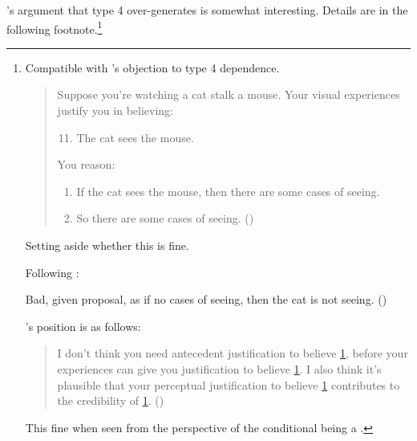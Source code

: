 \begin{note}
  \citeauthor{Pryor:2004ws}'s argument that type 4 over-generates is somewhat interesting.
  Details are in the following footnote.\footnote{
  Compatible with \citeauthor{Pryor:2004ws}'s objection to type 4 dependence.

    \begin{quote}
      Suppose you're watching a cat stalk a mouse. Your visual experiences justify you in believing:

      \begin{enumerate}[label=(\arabic*), ref=(\arabic*)]
        \setcounter{enumi}{10}
      \item
        \label{illu:Pryor:cat:1}
        The cat sees the mouse.
      \end{enumerate}

      You reason:

      \begin{enumerate}[label=(\arabic*), ref=(\arabic*), resume]
      \item
        \label{illu:Pryor:cat:2}
        If the cat sees the mouse, then there are some cases of seeing.
      \item
        \label{illu:Pryor:cat:3}
        So there are some cases of seeing.\nolinebreak
        \mbox{}\hfill\mbox{(\citeyear[361]{Pryor:2004ws})}
      \end{enumerate}
    \end{quote}

  Setting aside whether this is fine.

  Following \citeauthor{Pryor:2004ws}:

  Bad, given proposal, as if no cases of seeing, then the cat is not seeing. (\citeyear[361]{Pryor:2004ws})

  \citeauthor{Pryor:2004ws}'s position is as follows:

  \begin{quote}
    I don't think you need antecedent justification to believe \ref{illu:Pryor:cat:3}, before your experiences can give you justification to believe \ref{illu:Pryor:cat:1}.
    I also think it's plausible that your perceptual justification to believe \ref{illu:Pryor:cat:1} contributes to the credibility of \ref{illu:Pryor:cat:3}.\nolinebreak
    \mbox{}\hfill\mbox{(\citeyear[361]{Pryor:2004ws})}
  \end{quote}

  This fine when seen from the perspective of the conditional being a \requ{}.
  }
\end{note}

